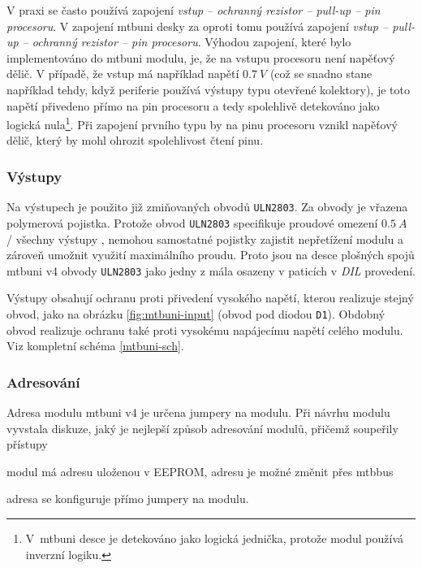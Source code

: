V praxi se často používá zapojení \textit{vstup – ochranný rezistor – pull-up –
pin procesoru}. V zapojení \gls{mtbuni} desky za oproti tomu používá zapojení
\textit{vstup – pull-up – ochranný rezistor – pin procesoru}. Výhodou zapojení,
které bylo implementováno do \gls{mtbuni} modulu, je, že na vstupu procesoru
není napěťový dělič. V případě, že vstup má například napětí $0.7~V$ (což se
snadno stane například tehdy, když periferie používá výstupy typu otevřené
kolektory), je toto napětí přivedeno přímo na pin procesoru a tedy spolehlivě
detekováno jako logická nula\footnote{V~\gls{mtbuni} desce je detekováno
jako logická jednička, protože modul používá inverzní logiku.}. Při zapojení
prvního typu by na pinu procesoru vznikl napěťový dělič, který by mohl ohrozit
spolehlivost čtení pinu.

\subsubsection{Výstupy}

Na výstupech je použito již zmiňovaných obvodů \texttt{ULN2803}. Za obvody
je vřazena polymerová pojistka. Protože obvod \texttt{ULN2803} specifikuje
proudové omezení $0.5~A$ / všechny výstupy \cite{uln2803-datasheet}, nemohou
samostatné pojistky zajistit nepřetížení modulu a zároveň umožnit využití
maximálního proudu. Proto jsou na desce plošných spojů \gls{mtbuni} v4 obvody
\texttt{ULN2803} jako jedny z mála osazeny v paticích v \textit{DIL} provedení.

Výstupy obsahují ochranu proti přivedení vysokého napětí, kterou realizuje
stejný obvod, jako na obrázku \ref{fig:mtbuni-input} (obvod pod diodou
\texttt{D1}). Obdobný obvod realizuje ochranu také proti vysokému napájecímu
napětí celého modulu. Viz kompletní schéma \ref{mtbuni-sch}.

\subsubsection{Adresování}

Adresa modulu \gls{mtbuni} v4 je určena jumpery na modulu. Při návrhu modulu
vyvstala diskuze, jaký je nejlepší způsob adresování modulů, přičemž soupeřily
přístupy

\begin{compactenum}
\item modul má adresu uloženou v EEPROM, adresu je možné změnit přes \gls{mtbbus}
\item adresa se konfiguruje přímo jumpery na modulu.
\end{compactenum}

